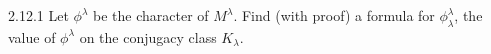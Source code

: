 \documentclass{../../math174}
\date{Wednesday, April 10}
\author{}
\begin{document}
\begin{problemlist}
\item[2.12.1] Let \(\phi^\lambda\) be the character of \(M^\lambda\).
  Find (with proof) a formula for \(\phi_\lambda^\lambda\), the value
  of \(\phi^\lambda\) on the conjugacy class \(K_\lambda\).

  \begin{solution}

  \end{solution}
\end{problemlist}
\end{document}
